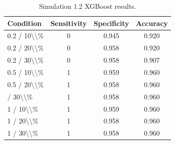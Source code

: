 \begin{table}[!h]
\centering
\caption{\label{tab:tab:sim12_xgb}Simulation 1.2 XGBoost results.}
\centering
\begin{tabular}[t]{lccc}
\toprule
Condition & Sensitivity & Specificity & Accuracy\\
\midrule
0.2 / 10\textbackslash{}\textbackslash{}\% & 0 & 0.945 & 0.920\\
0.2 / 20\textbackslash{}\textbackslash{}\% & 0 & 0.958 & 0.920\\
0.2 / 30\textbackslash{}\textbackslash{}\% & 0 & 0.958 & 0.907\\
0.5 / 10\textbackslash{}\textbackslash{}\% & 1 & 0.959 & 0.960\\
0.5 / 20\textbackslash{}\textbackslash{}\% & 1 & 0.958 & 0.960\\
\addlinespace
0.5 / 30\textbackslash{}\textbackslash{}\% & 1 & 0.958 & 0.960\\
1 / 10\textbackslash{}\textbackslash{}\% & 1 & 0.959 & 0.960\\
1 / 20\textbackslash{}\textbackslash{}\% & 1 & 0.958 & 0.960\\
1 / 30\textbackslash{}\textbackslash{}\% & 1 & 0.958 & 0.960\\
\bottomrule
\end{tabular}
\end{table}
